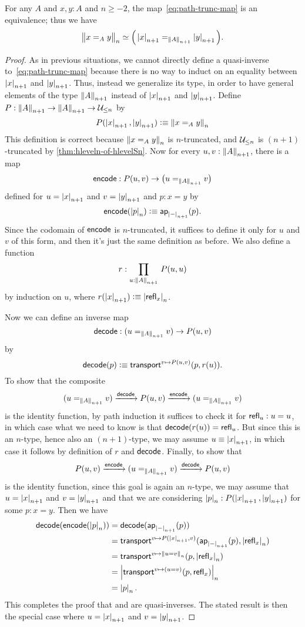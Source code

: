 \begin{thm} \label{thm:path-truncation}
  For any $A$ and $x,y:A$ and $n\ge -2$, the map~\eqref{eq:path-trunc-map} is an equivalence; thus we have
  \[ \eqv{\ttrunc n{x=_Ay}}{\Big(\tproj {n+1}x=_{\trunc{n+1}A}\tproj {n+1}y\Big)}. \]
\end{thm}

\begin{proof}
  As in previous situations, we cannot directly define a quasi-inverse to~\eqref{eq:path-trunc-map} because there is no way to induct on an
equality between $\tproj {n+1}x$ and $\tproj {n+1}y$.
  Thus, instead we generalize its type, in order to have general elements of the type $\trunc{n+1}A$ instead of $\tproj {n+1}x$ and $\tproj
{n+1}y$.
  Define $P:\trunc {n+1}A\to\trunc {n+1}A\to\typele{n}$ by
  \[P(\tproj {n+1}x,\tproj {n+1}y)\defeq \trunc n{x=_Ay}\]
  This definition is correct because $\trunc n{x=_Ay}$ is $n$-truncated, and $\typele{n}$ is $(n+1)$-truncated by
\autoref{thm:hleveln-of-hlevelSn}.
  Now for every $u,v:\trunc{n+1}A$, there is a map
  \[\encode:P(u,v) \to \big(u=_{\trunc{n+1}A}v\big)\]
  defined for $u=\tproj {n+1}x$ and $v=\tproj {n+1}y$ and $p:x=y$ by
  \[\encode(\tproj n{p})\defeq \apfunc{\tproj{n+1}-} (p).\]
  Since the codomain of $\encode$ is $n$-truncated, it suffices to define it only for $u$ and $v$ of this form, and then it's just the same
definition as before.
  We also define a function
  \[ r : \prd{u:\trunc{n+1} A} P(u,u) \]
  by induction on $u$, where $r(\tproj{n+1} x) \defeq \tproj n {\refl x}$.

  Now we can define an inverse map
  \[\decode: (u=_{\trunc{n+1}A}v) \to P(u,v)\]
  by
  \[\decode(p) \defeq \transfib{v\mapsto P(u,v)}{p}{r(u)}. \]
  To show that the composite
  \[ (u=_{\trunc{n+1}A}v) \xrightarrow{\decode} P(u,v) \xrightarrow{\encode} (u=_{\trunc{n+1}A}v) \]
  is the identity function, by path induction it suffices to check it for $\refl u : u=u$, in which case what we need to know is that
$\decode(r(u)) = \refl{u}$.
  But since this is an $n$-type, hence also an $(n+1)$-type, we may assume $u\jdeq \tproj {n+1} x$, in which case it follows by definition
of $r$ and $\decode$.
  Finally, to show that 
  \[ P(u,v) \xrightarrow{\encode} (u=_{\trunc{n+1}A}v) \xrightarrow{\decode} P(u,v) \]
  is the identity function, since this goal is again an $n$-type, we may assume that $u=\tproj {n+1}x$ and $v=\tproj {n+1}y$ and that we are
considering $\tproj n p:P(\tproj{n+1}x,\tproj{n+1}y)$ for some $p:x=y$.
  Then we have
  \begin{align*}
    \decode(\encode(\tproj n p)) &= \decode(\apfunc{\tproj{n+1}-}(p))\\
    &= \transfib{v\mapsto P(\tproj{n+1}x,v)}{\apfunc{\tproj{n+1}-}(p)}{\tproj n {\refl x}}\\
    &= \transfib{v\mapsto \trunc n{u=v}}{p}{\tproj n {\refl x}}\\
    &= \tproj n {\transfib{v \mapsto (u=v)}{p}{\refl x}}\\
    &= \tproj n p.
  \end{align*}
  This completes the proof that \encode and \decode are quasi-inverses.
  The stated result is then the special case where $u=\tproj {n+1}x$ and $v=\tproj {n+1}y$.
\end{proof}

